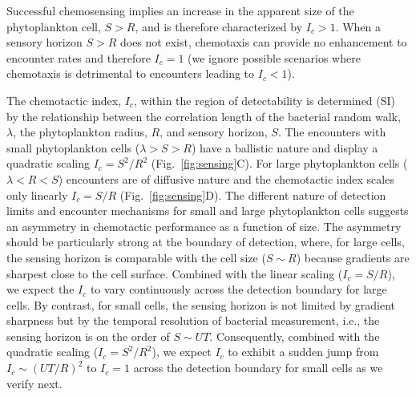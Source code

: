 \documentclass[9pt,twocolumn,twoside]{pnas-new}
\begin{document}
Successful chemosensing implies an increase in the apparent size of the phytoplankton cell, $S>R$, and is therefore characterized by $I_c>1$.
When a sensory horizon $S>R$ does not exist, chemotaxis can provide no enhancement to encounter rates and therefore $I_c=1$ (we ignore possible scenarios where chemotaxis is detrimental to encounters leading to $I_c<1$).

The chemotactic index, $I_c$, within the region of detectability is determined (SI) by the relationship between the correlation length of the bacterial random walk, $\lambda$, the phytoplankton radius, $R$, and sensory horizon, $S$. The encounters with small phytoplankton cells ($\lambda>S>R$) have a ballistic nature and display a quadratic scaling $I_c = S^2/R^2$ (Fig.~\ref{fig:sensing}C). For large phytoplankton cells ($\lambda < R < S$) encounters are of diffusive nature and the chemotactic index scales only linearly $I_c = S/R$ (Fig.~\ref{fig:sensing}D).
The different nature of detection limits and encounter mechanisms for small and large phytoplankton cells suggests an asymmetry in chemotactic performance as a function of size. The asymmetry should be particularly strong at the boundary of detection, where, for large cells, the sensing horizon is comparable with the cell size ($S\sim R$) because gradients are sharpest close to the cell surface. Combined with the linear scaling ($I_c=S/R$), we expect the $I_c$ to vary continuously across the detection boundary for large cells. By contrast, for small cells, the sensing horizon is not limited by gradient sharpness but by the temporal resolution of bacterial measurement, i.e., the sensing horizon is on the order of $S\sim UT$. Consequently, combined with the quadratic scaling ($I_c = S^2/R^2$), we expect $I_c$ to exhibit a sudden jump from $I_c \sim (UT/R)^2$ to $I_c = 1$ across the detection boundary for small cells as we verify next. 
\end{document}
